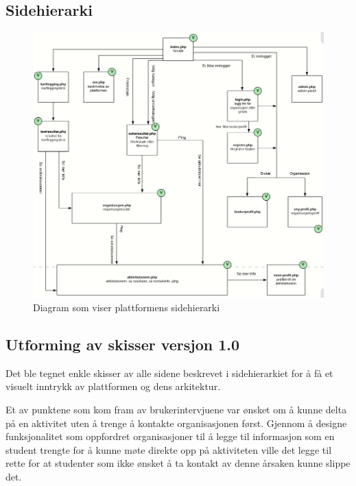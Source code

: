 \subsection{Sidehierarki}
\begin{figure}[H]
\includegraphics[width=\textwidth]{Illustrasjoner/trehierarki.png}
\caption{Diagram som viser plattformens sidehierarki}
\label{fig:trehierarki}
\end{figure}


\subsection{Utforming av skisser versjon 1.0}
\label{section:utforming-1}

Det ble tegnet enkle skisser av alle sidene beskrevet i sidehierarkiet for å få et visuelt inntrykk av plattformen og dens arkitektur.

Et av punktene som kom fram av brukerintervjuene var ønsket om å kunne delta på en aktivitet uten å trenge å kontakte organisasjonen først. Gjennom å designe funksjonalitet som oppfordret organisasjoner til å legge til informasjon som en student trengte for å kunne møte direkte opp på aktiviteten ville det legge til rette for at studenter som ikke ønsket å ta kontakt av denne årsaken kunne slippe det.

